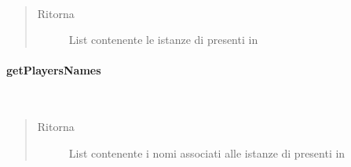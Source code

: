 \documentclass[letterpaper,10pt,italian]{sphinxmanual}
\begin{document}
\begin{fulllineitems}
\label{\detokenize{source/it/unicam/cs/pa/mastermind/players/PlayerFactoryRegistry:it.unicam.cs.pa.mastermind.players.PlayerFactoryRegistry.getPlayerFactoriesInstances()}}~\begin{quote}\begin{description}
\item[{Ritorna}] \leavevmode
List contenente le istanze di  presenti in 

\end{description}\end{quote}

\end{fulllineitems}



\paragraph{getPlayersNames}
\label{\detokenize{source/it/unicam/cs/pa/mastermind/players/PlayerFactoryRegistry:getplayersnames}}

\begin{fulllineitems}
\label{\detokenize{source/it/unicam/cs/pa/mastermind/players/PlayerFactoryRegistry:it.unicam.cs.pa.mastermind.players.PlayerFactoryRegistry.getPlayersNames()}}~\begin{quote}\begin{description}
\item[{Ritorna}] \leavevmode
List contenente i nomi associati alle istanze di  presenti in 

\end{description}\end{quote}

\end{fulllineitems}
\end{document}
